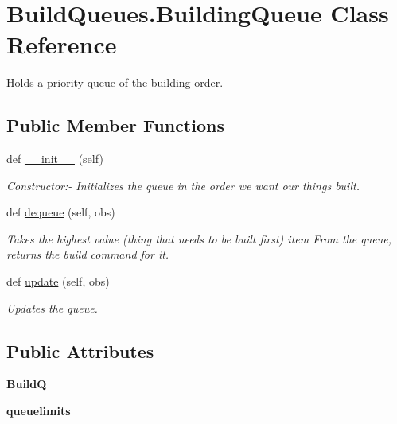 \hypertarget{classBuildQueues_1_1BuildingQueue}{}\section{Build\+Queues.\+Building\+Queue Class Reference}
\label{classBuildQueues_1_1BuildingQueue}


Holds a priority queue of the building order.  


\subsection*{Public Member Functions}
\begin{DoxyCompactItemize}
\item 
def \hyperlink{classBuildQueues_1_1BuildingQueue_a8008ce704e249c97c5b01b62804d801f}{\+\_\+\+\_\+init\+\_\+\+\_\+} (self)
\begin{DoxyCompactList}\small\item\em Constructor\+:-\/ Initializes the queue in the order we want our things built. \end{DoxyCompactList}\item 
def \hyperlink{classBuildQueues_1_1BuildingQueue_a52d960e806a6ed6eef1cc5765bb2d71e}{dequeue} (self, obs)
\begin{DoxyCompactList}\small\item\em Takes the highest \textquotesingle{}value\textquotesingle{} (thing that needs to be built first) item From the queue, returns the build command for it. \end{DoxyCompactList}\item 
def \hyperlink{classBuildQueues_1_1BuildingQueue_a80abaeb74b2e85535810a03950cc1018}{update} (self, obs)
\begin{DoxyCompactList}\small\item\em \textquotesingle{}Updates\textquotesingle{} the queue. \end{DoxyCompactList}\end{DoxyCompactItemize}
\subsection*{Public Attributes}
\begin{DoxyCompactItemize}
\item 
{\bfseries BuildQ}\hypertarget{classBuildQueues_1_1BuildingQueue_a4dfe00f1a7deb14a5686e6e26559427d}{}\label{classBuildQueues_1_1BuildingQueue_a4dfe00f1a7deb14a5686e6e26559427d}

\item 
{\bfseries queuelimits}\hypertarget{classBuildQueues_1_1BuildingQueue_a4fbbb181b46cc93ec8ab40110691ce9c}{}\label{classBuildQueues_1_1BuildingQueue_a4fbbb181b46cc93ec8ab40110691ce9c}

\end{DoxyCompactItemize}


